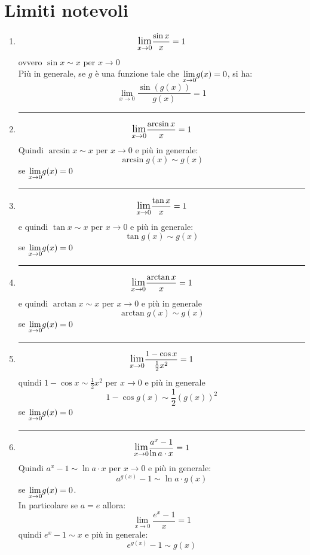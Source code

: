 \documentclass[12pt]{report}
\begin{document}
	\section{Limiti notevoli}
	\begin{enumerate}
		\item \[\mathlarger{\lim_{x \to 0}}\frac{\sin x}{x} = 1\] ovvero $\sin x \sim x$ per $x \to 0$ \\
		Più in generale, se $g$ è una funzione tale che $\mathlarger{\lim_{x \to 0}}g(x) = 0$, si ha:
		\[
		\lim_{x \to 0}\frac{\sin(g(x))}{g(x)} = 1
		\]
		\par\noindent\rule{\linewidth}{0.5pt}\par
		\item \[\mathlarger{\lim_{x \to 0}}\frac{\arcsin x}{x} = 1\]
		Quindi $\arcsin x \sim x$ per $x \to 0$ e più in generale: \[\arcsin g(x) \sim g(x)\] se $\mathlarger{\lim_{x \to 0}}g(x) = 0$

		\par\noindent\rule{\linewidth}{0.5pt}\par
		\item \[\mathlarger{\lim_{x \to 0}}\frac{\tan x}{x} = 1\] e quindi $\tan x \sim x$ per $x \to 0$ e più in generale: \[\tan g(x) \sim g(x)\] se $\mathlarger{\lim_{x \to 0}}g(x) = 0$

		\par\noindent\rule{\linewidth}{0.5pt}\par
		\item \[\mathlarger{\lim_{x \to 0}}\frac{\arctan x}{x} = 1\] e quindi $\arctan x \sim x$ per $x \to 0$ e più in generale \[\arctan g(x) \sim g(x)\] se $\mathlarger{\lim_{x \to 0}}g(x) = 0$

		\par\noindent\rule{\linewidth}{0.5pt}\par
		\item \[\mathlarger{\lim_{x \to 0}}\frac{1 - \cos x}{\frac{1}{2}x^2} = 1\] quindi $1 - \cos x \sim \frac{1}{2}x^2$ per $x \to 0$ e più in generale \[1 - \cos g(x) \sim \frac{1}{2}(g(x))^2\] se $\mathlarger{\lim_{x \to 0}}g(x) = 0$

		\par\noindent\rule{\linewidth}{0.5pt}\par
		\item \[\mathlarger{\lim_{x \to 0}}\frac{a^x - 1}{\ln a \cdot x} = 1\]
		Quindi $a^x - 1 \sim \ln a \cdot x$ per $x \to 0$ e più in generale: \[a^{g(x)} - 1 \sim \ln a \cdot g(x)\] se $\mathlarger{\lim_{x \to 0}}g(x) = 0$. \\
		In particolare se $a = e$ allora:
		\[
		\lim_{x \to 0}\frac{e^x - 1}{x} = 1
		\]
		quindi $e^x - 1 \sim x$ e più in generale: \[e^{g(x)} - 1 \sim g(x)\]


\end{enumerate}
\end{document}
